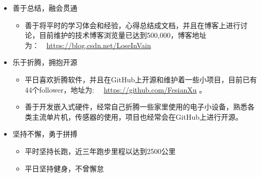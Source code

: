 %
%



\begin{itemize}
\item 善于总结，融会贯通
	\begin{itemize}
		\item 善于将平时的学习体会和经验，心得总结成文档，并且在博客上进行讨论，目前维护的技术博客浏览量已达到500,000，博客地址为：\faEdge \ \
		\href{https://blog.csdn.net/LoseInVain}{https://blog.csdn.net/LoseInVain}
	\end{itemize}


\item 乐于折腾，拥抱开源
	\begin{itemize}
		\item 平日喜欢折腾软件，并且在GitHub上开源和维护着一些小项目，目前已有44个follower，地址为: \githubSymbol \ \ \href{https://github.com/FesianXu}{https://github.com/FesianXu} 。 
		\item 善于开发嵌入式硬件，经常自己折腾一些家里使用的电子小设备，熟悉各类主流单片机，传感器的使用，项目也经常会在GitHub上进行开源。
	\end{itemize}

\item 坚持不懈，勇于拼搏
	\begin{itemize}
		\item 平时坚持长跑，近三年跑步里程以达到2500公里
		\item 平日坚持健身，不曾懈怠
	\end{itemize}

\end{itemize}